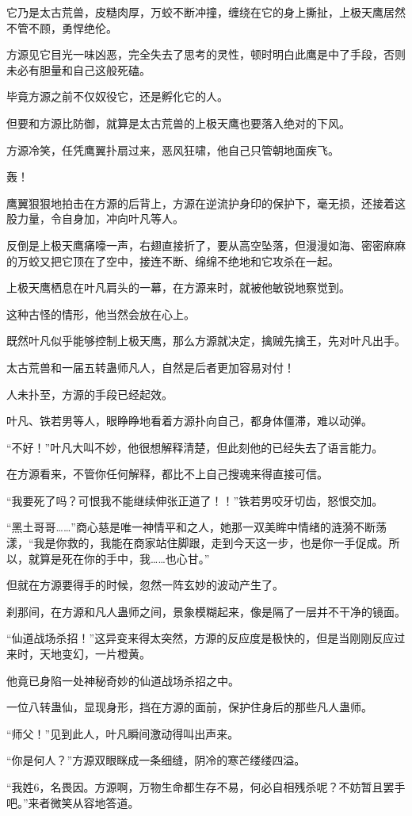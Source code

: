 \begin{this_body}
它乃是太古荒兽，皮糙肉厚，万蛟不断冲撞，缠绕在它的身上撕扯，上极天鹰居然不管不顾，勇悍绝伦。

方源见它目光一味凶恶，完全失去了思考的灵性，顿时明白此鹰是中了手段，否则未必有胆量和自己这般死磕。

毕竟方源之前不仅奴役它，还是孵化它的人。

但要和方源比防御，就算是太古荒兽的上极天鹰也要落入绝对的下风。

方源冷笑，任凭鹰翼扑扇过来，恶风狂啸，他自己只管朝地面疾飞。

轰！

鹰翼狠狠地拍击在方源的后背上，方源在逆流护身印的保护下，毫无损，还接着这股力量，令自身加，冲向叶凡等人。

反倒是上极天鹰痛嚎一声，右翅直接折了，要从高空坠落，但漫漫如海、密密麻麻的万蛟又把它顶在了空中，接连不断、绵绵不绝地和它攻杀在一起。

上极天鹰栖息在叶凡肩头的一幕，在方源来时，就被他敏锐地察觉到。

这种古怪的情形，他当然会放在心上。

既然叶凡似乎能够控制上极天鹰，那么方源就决定，擒贼先擒王，先对叶凡出手。

太古荒兽和一届五转蛊师凡人，自然是后者更加容易对付！

人未扑至，方源的手段已经起效。

叶凡、铁若男等人，眼睁睁地看着方源扑向自己，都身体僵滞，难以动弹。

“不好！”叶凡大叫不妙，他很想解释清楚，但此刻他的已经失去了语言能力。

在方源看来，不管你任何解释，都比不上自己搜魂来得直接可信。

“我要死了吗？可恨我不能继续伸张正道了！！”铁若男咬牙切齿，怒恨交加。

“黑土哥哥……”商心慈是唯一神情平和之人，她那一双美眸中情绪的涟漪不断荡漾，“我是你救的，我能在商家站住脚跟，走到今天这一步，也是你一手促成。所以，就算是死在你的手中，我……也心甘。”

但就在方源要得手的时候，忽然一阵玄妙的波动产生了。

刹那间，在方源和凡人蛊师之间，景象模糊起来，像是隔了一层并不干净的镜面。

“仙道战场杀招！”这异变来得太突然，方源的反应度是极快的，但是当刚刚反应过来时，天地变幻，一片橙黄。

他竟已身陷一处神秘奇妙的仙道战场杀招之中。

一位八转蛊仙，显现身形，挡在方源的面前，保护住身后的那些凡人蛊师。

“师父！”见到此人，叶凡瞬间激动得叫出声来。

“你是何人？”方源双眼眯成一条细缝，阴冷的寒芒缕缕四溢。

“我姓6，名畏因。方源啊，万物生命都生存不易，何必自相残杀呢？不妨暂且罢手吧。”来者微笑从容地答道。

\end{this_body}

